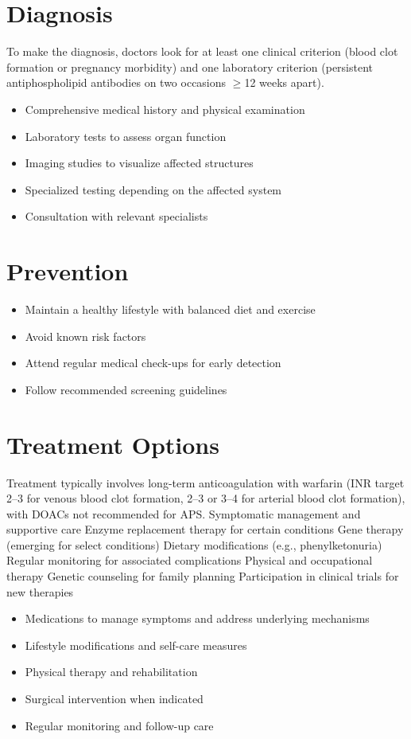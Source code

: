 \section{Diagnosis}
To make the diagnosis, doctors look for at least one clinical criterion (blood clot formation or pregnancy morbidity) and one laboratory criterion (persistent antiphospholipid antibodies on two occasions $\geq$12 weeks apart).

\begin{itemize}[noitemsep]
  \item Comprehensive medical history and physical examination
  \item Laboratory tests to assess organ function
  \item Imaging studies to visualize affected structures
  \item Specialized testing depending on the affected system
  \item Consultation with relevant specialists
\end{itemize}
\section{Prevention}
\begin{itemize}[noitemsep]
  \item Maintain a healthy lifestyle with balanced diet and exercise
  \item Avoid known risk factors
  \item Attend regular medical check-ups for early detection
  \item Follow recommended screening guidelines
\end{itemize}
\section{Treatment Options}
Treatment typically involves long-term anticoagulation with warfarin (INR target 2--3 for venous blood clot formation, 2--3 or 3--4 for arterial blood clot formation), with DOACs not recommended for APS. Symptomatic management and supportive care Enzyme replacement therapy for certain conditions Gene therapy (emerging for select conditions) Dietary modifications (e.g., phenylketonuria) Regular monitoring for associated complications Physical and occupational therapy Genetic counseling for family planning Participation in clinical trials for new therapies

\begin{itemize}[noitemsep]
  \item Medications to manage symptoms and address underlying mechanisms
  \item Lifestyle modifications and self-care measures
  \item Physical therapy and rehabilitation
  \item Surgical intervention when indicated
  \item Regular monitoring and follow-up care
\end{itemize}
